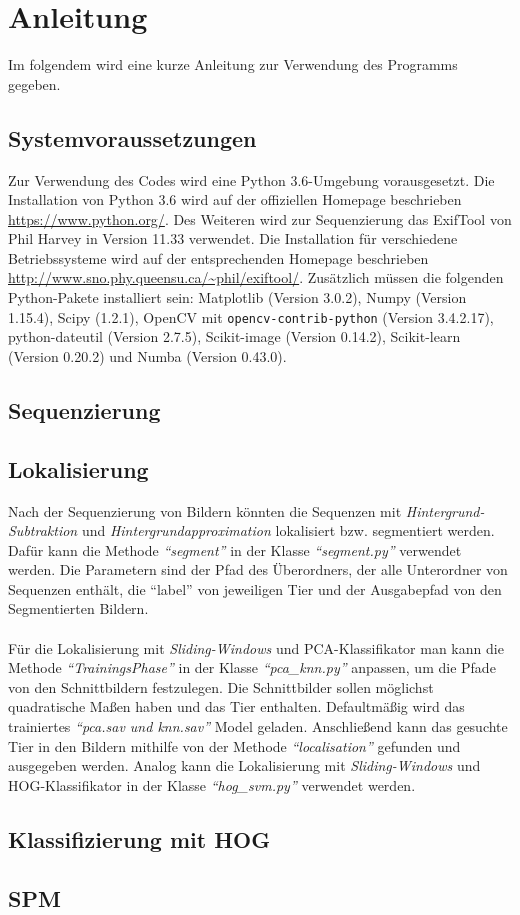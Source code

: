 \section*{Anleitung}
Im folgendem wird eine kurze Anleitung zur Verwendung des Programms gegeben.
\subsection*{Systemvoraussetzungen}
Zur Verwendung des Codes wird eine Python 3.6-Umgebung vorausgesetzt. Die Installation von Python 3.6 wird auf der offiziellen Homepage beschrieben \url{https://www.python.org/}. Des Weiteren wird zur Sequenzierung das ExifTool von Phil Harvey in Version 11.33 verwendet. Die Installation für verschiedene Betriebssysteme wird auf der entsprechenden Homepage beschrieben \url{http://www.sno.phy.queensu.ca/~phil/exiftool/}. Zusätzlich müssen die folgenden Python-Pakete installiert sein: Matplotlib (Version 3.0.2), Numpy (Version 1.15.4), Scipy (1.2.1),  OpenCV mit \texttt{opencv-contrib-python} (Version 3.4.2.17), python-dateutil (Version 2.7.5), Scikit-image (Version 0.14.2), Scikit-learn (Version 0.20.2) und Numba (Version 0.43.0).

\subsection*{Sequenzierung}
\subsection*{Lokalisierung}
Nach der Sequenzierung von Bildern könnten die Sequenzen mit \textit{Hintergrund-Subtraktion} und \textit{Hintergrundapproximation} lokalisiert bzw. segmentiert werden. Dafür kann die Methode \textit{``segment''} in der Klasse \textit{``segment.py''} verwendet werden.
Die Parametern sind der Pfad des Überordners, der alle Unterordner von Sequenzen enthält, die ``label'' von jeweiligen Tier und der Ausgabepfad von den Segmentierten Bildern.\\\\
Für die Lokalisierung mit \textit{Sliding-Windows} und PCA-Klassifikator man kann die Methode \textit{``TrainingsPhase''} in der Klasse \textit{``pca\_knn.py''} anpassen, um die Pfade von den Schnittbildern festzulegen. Die Schnittbilder sollen möglichst quadratische Maßen haben und das Tier enthalten. Defaultmäßig wird das trainiertes \textit{``pca.sav und knn.sav''} Model geladen. Anschließend kann das gesuchte Tier in den Bildern mithilfe von der Methode \textit{``localisation''} gefunden und ausgegeben werden. Analog kann die Lokalisierung mit \textit{Sliding-Windows} und HOG-Klassifikator in der Klasse \textit{``hog\_svm.py''} verwendet werden.
\subsection*{Klassifizierung mit HOG}
\subsection*{SPM}





